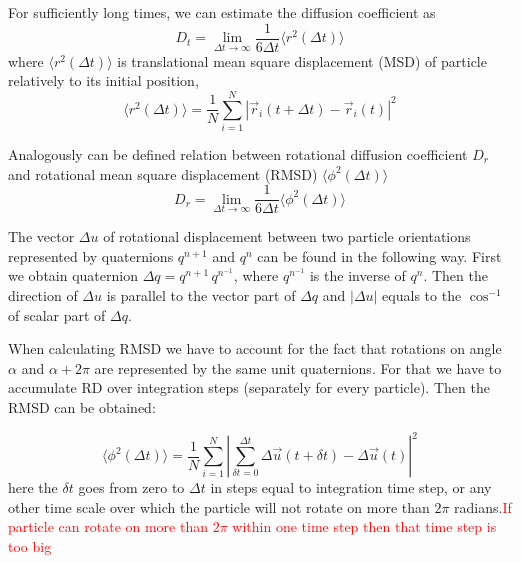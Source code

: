 For sufficiently long times, we can estimate the diffusion coefficient as
\begin{equation}
\label{eq:translation_diffusion_vs_displacement}
	D_t = \lim_{\Delta t \to \infty} \frac{1}{6 \Delta t} \langle r^2(\Delta t)\rangle
\end{equation}
where $\langle r^2(\Delta t)\rangle$ is translational mean square displacement (MSD) of particle relatively to its initial position,
\begin{equation}
	\langle r^2(\Delta t)\rangle
	 = \frac{1}{N} \sum_{i=1}^{N} |\vec{r}_i(t + \Delta t) - \vec{r}_i(t)|^2
\end{equation}

Analogously can be defined relation between rotational diffusion coefficient $D_r$ and rotational mean square displacement (RMSD) $\langle \phi^2(\Delta t) \rangle$
\begin{equation}
\label{eq:rotational_diffusion_vs_displacement}
	D_r = \lim_{\Delta t \to \infty} \frac{1}{6 \Delta t} \langle \phi^2(\Delta t)\rangle
\end{equation}

The vector $\Delta u$ of rotational displacement between two particle orientations represented by quaternions $q^{n+1}$ and $q^n$ can be found in the following way. First we obtain quaternion $\Delta q = q^{n+1}\, q^{n^{-1}}$, where $q^{n^{-1}}$ is the inverse of $q^n$. Then the direction of $\Delta u$ is parallel to the vector part of $\Delta q$ and $|\Delta u|$ equals to the $\cos^{-1}$ of scalar part of $\Delta q$.

When calculating RMSD we have to account for the fact that rotations on angle $
\alpha$ and $\alpha + 2\pi$ are represented by the same unit quaternions. For that we have to accumulate RD over integration steps (separately for every particle). Then the RMSD can be obtained:

\begin{equation}
\label{eq:rotational_mean_square_displacement}
	\langle \phi^2 (\Delta t)\rangle
		= \frac{1}{N} \sum_{i=1}^{N} 
			\left|
				\sum_{\delta t = 0}^{\Delta t}
					\Delta \vec{u}(t + \delta t) 
					- \Delta \vec{u}(t)
			\right|^2
\end{equation}
here the $\delta t$ goes from zero to $\Delta t$ in steps equal to integration time step, or any other time scale over which the particle will not rotate on more than $2 \pi$ radians.\textcolor{red}{If particle can rotate on more than $2 \pi$ within one time step then that time step is too big}


